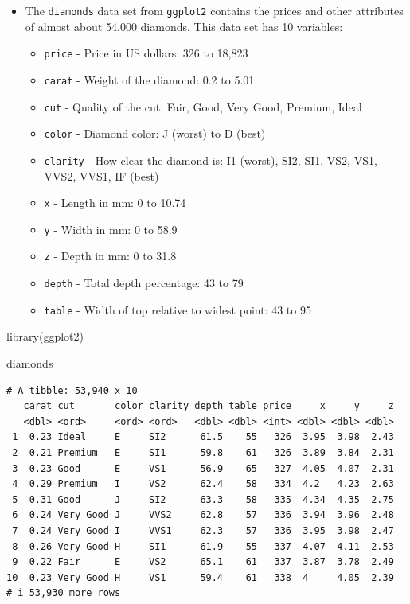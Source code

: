 \documentclass[
  letterpaper,
  DIV=11,
  numbers=noendperiod]{scrreprt}
\newenvironment{Shaded}{\begin{snugshade}}{\end{snugshade}}
\newcommand{\FunctionTok}[1]{\textcolor[rgb]{0.28,0.35,0.67}{#1}}
\newcommand{\NormalTok}[1]{\textcolor[rgb]{0.00,0.23,0.31}{#1}}
\begin{document}
\begin{itemize}
\item
  The \texttt{diamonds} data set from \texttt{ggplot2} contains the
  prices and other attributes of almost about 54,000 diamonds. This data
  set has 10 variables:

  \begin{itemize}
  \item
    \texttt{price} - Price in US dollars: 326 to 18,823
  \item
    \texttt{carat} - Weight of the diamond: 0.2 to 5.01
  \item
    \texttt{cut} - Quality of the cut: Fair, Good, Very Good, Premium,
    Ideal
  \item
    \texttt{color} - Diamond color: J (worst) to D (best)
  \item
    \texttt{clarity} - How clear the diamond is: I1 (worst), SI2, SI1,
    VS2, VS1, VVS2, VVS1, IF (best)
  \item
    \texttt{x} - Length in mm: 0 to 10.74
  \item
    \texttt{y} - Width in mm: 0 to 58.9
  \item
    \texttt{z} - Depth in mm: 0 to 31.8
  \item
    \texttt{depth} - Total depth percentage: 43 to 79
  \item
    \texttt{table} - Width of top relative to widest point: 43 to 95
  \end{itemize}
\end{itemize}

\begin{Shaded}
\begin{Highlighting}[]
\FunctionTok{library}\NormalTok{(ggplot2)}

\NormalTok{diamonds}
\end{Highlighting}
\end{Shaded}

\begin{verbatim}
# A tibble: 53,940 x 10
   carat cut       color clarity depth table price     x     y     z
   <dbl> <ord>     <ord> <ord>   <dbl> <dbl> <int> <dbl> <dbl> <dbl>
 1  0.23 Ideal     E     SI2      61.5    55   326  3.95  3.98  2.43
 2  0.21 Premium   E     SI1      59.8    61   326  3.89  3.84  2.31
 3  0.23 Good      E     VS1      56.9    65   327  4.05  4.07  2.31
 4  0.29 Premium   I     VS2      62.4    58   334  4.2   4.23  2.63
 5  0.31 Good      J     SI2      63.3    58   335  4.34  4.35  2.75
 6  0.24 Very Good J     VVS2     62.8    57   336  3.94  3.96  2.48
 7  0.24 Very Good I     VVS1     62.3    57   336  3.95  3.98  2.47
 8  0.26 Very Good H     SI1      61.9    55   337  4.07  4.11  2.53
 9  0.22 Fair      E     VS2      65.1    61   337  3.87  3.78  2.49
10  0.23 Very Good H     VS1      59.4    61   338  4     4.05  2.39
# i 53,930 more rows
\end{verbatim}
\end{document}
